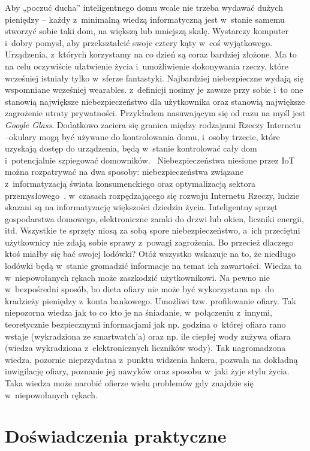 \documentclass{xmgr}
\begin{document}
	Aby „poczuć ducha” inteligentnego domu wcale nie trzeba wydawać dużych pieniędzy – każdy z~minimalną wiedzą informatyczną jest w~stanie samemu stworzyć sobie taki dom, na większą lub mniejszą skalę. Wystarczy komputer i~dobry pomysł, aby przekształcić swoje cztery kąty w~coś wyjątkowego.
	Urządzenia, z~których korzystamy na co dzień są coraz bardziej złożone. Ma to na celu oczywiście ułatwienie życia i~umożliwienie dokonywania rzeczy, które wcześniej istniały tylko w~sferze fantastyki.
	Najbardziej niebezpieczne wydają się wspomniane wcześniej wearables. z~definicji nosimy je zawsze przy sobie i~to one stanowią największe niebezpieczeństwo dla użytkownika oraz stanowią największe zagrożenie utraty prywatności. Przykładem nasuwającym się od razu na myśl jest \emph{Google Glass}. Dodatkowo zaciera się granica między rodzajami Rzeczy Internetu –okulary mogą być używane do kontrolowania domu, i~osoby trzecie, które uzyskają dostęp do urządzenia, będą w~stanie kontrolować cały dom i~potencjalnie  szpiegować domowników.~\cite{Kaspersky:2014:CMC}
	Niebezpieczeństwa niesione przez IoT można rozpatrywać na dwa sposoby: niebezpieczeństwa związane z~informatyzacją świata konsumenckiego oraz optymalizacją sektora przemysłowego~\cite{Ks:2014:CMC}. w~czasach rozpędzającego się rozwoju Internetu Rzeczy, ludzie skazani są na informatyzację większości dziedzin życia. Inteligentny sprzęt gospodarstwa domowego, elektroniczne zamki do drzwi lub okien, liczniki energii, itd. Wszystkie te sprzęty niosą za sobą spore niebezpieczeństwo, a~ich przeciętni użytkownicy nie zdają sobie sprawy z~powagi zagrożenia. Bo przecież dlaczego ktoś miałby się bać swojej lodówki? Otóż wszystko wskazuje na to, że niedługo lodówki będą w~stanie gromadzić informacje na temat ich zawartości. Wiedza ta w~niepowołanych rękach może zaszkodzić użytkownikowi. Na pewno nie w~bezpośredni sposób, bo dieta ofiary nie może być wykorzystana np. do kradzieży pieniędzy z~konta bankowego. Umożliwi tzw. profilowanie ofiary. Tak niepozorna wiedza jak to co kto je na śniadanie, w~połączeniu z~innymi, teoretycznie bezpiecznymi informacjami jak np. godzina o~której ofiara rano wstaje (wykradziona ze smartwatch'a) oraz np. ile ciepłej wody zużywa ofiara (wiedza wykradziona z~elektronicznych liczników wody). Tak nagromadzona wiedza, pozornie nieprzydatna z~punktu widzenia hakera, pozwala na dokładną inwigilację ofiary, poznanie jej nawyków oraz sposobu w~jaki żyje stylu życia. Taka wiedza może narobić ofierze wielu problemów gdy znajdzie się w~niepowołanych rękach.

\chapter{Doświadczenia praktyczne}
\end{document}
